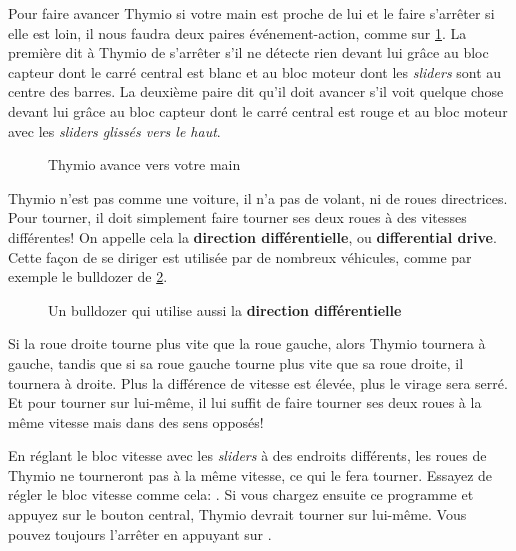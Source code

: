 Pour faire avancer Thymio si votre main est proche de lui et le faire s'arrêter si elle est loin, il nous faudra deux paires événement-action, comme sur \cref{fig.follow-hand}. La première dit à Thymio de s'arrêter s'il ne détecte rien devant lui grâce au bloc capteur dont le carré central est blanc et au bloc moteur dont les \textit{sliders} sont au centre des barres. La deuxième paire dit qu'il doit avancer s'il voit quelque chose devant lui grâce au bloc capteur dont le carré central est rouge et au bloc moteur avec les \textit{sliders glissés vers le haut}.

\begin{figure}[h]
\begin{center}
\caption{Thymio avance vers votre main}\label{fig.follow-hand}
\end{center}
\end{figure}


Thymio n'est pas comme une voiture, il n'a pas de volant, ni de roues directrices. Pour tourner, il doit simplement faire tourner ses deux roues à des vitesses différentes! On appelle cela la \textbf{direction différentielle}, ou \textbf{differential drive}. Cette façon de se diriger est utilisée par de nombreux véhicules, comme par exemple le bulldozer de \cref{fig.bull}.

\begin{figure}
\begin{center}
\caption{Un bulldozer qui utilise aussi  la \textbf{direction différentielle}}\label{fig.bull}
\end{center}
\end{figure}

Si la roue droite tourne plus vite que la roue gauche, alors Thymio tournera à gauche, tandis que si sa roue gauche tourne plus vite que sa roue droite, il tournera à droite. Plus la différence de vitesse est élevée, plus le virage sera serré. Et pour tourner sur lui-même, il lui suffit de faire tourner ses deux roues à la même vitesse mais dans des sens opposés!

En réglant le bloc vitesse avec les \textit{sliders} à des endroits différents, les roues de Thymio ne tourneront pas à la même vitesse, ce qui le fera tourner. Essayez de régler le bloc vitesse comme cela: . Si vous chargez ensuite ce programme et appuyez sur le bouton central, Thymio devrait tourner sur lui-même. Vous pouvez toujours l'arrêter en appuyant sur .

